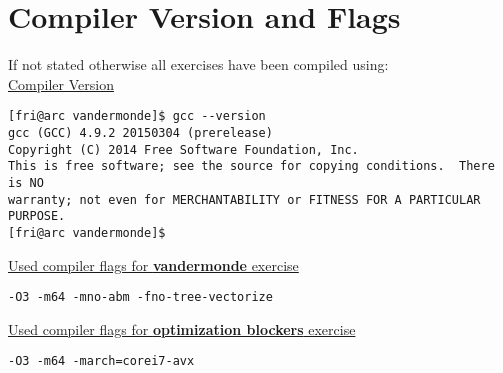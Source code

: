 \documentclass[10pt,a4paper,oneside,notitlepage]{report}
\begin{document}
\newpage

\section*{Compiler Version and Flags}
\label{compiler_version}
If not stated otherwise all exercises have been compiled using: \\ 

\underline{Compiler Version}
\begin{verbatim}
[fri@arc vandermonde]$ gcc --version
gcc (GCC) 4.9.2 20150304 (prerelease)
Copyright (C) 2014 Free Software Foundation, Inc.
This is free software; see the source for copying conditions.  There is NO
warranty; not even for MERCHANTABILITY or FITNESS FOR A PARTICULAR PURPOSE.
[fri@arc vandermonde]$
\end{verbatim}

\underline{Used compiler flags for \textbf{vandermonde} exercise} 
\begin{verbatim}
-O3 -m64 -mno-abm -fno-tree-vectorize
\end{verbatim}

\underline{Used compiler flags for \textbf{optimization blockers} exercise} 
\begin{verbatim}
-O3 -m64 -march=corei7-avx
\end{verbatim}
\end{document}
